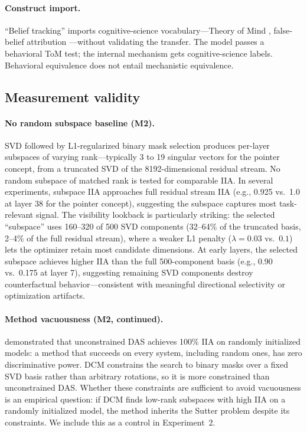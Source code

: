 \documentclass{article}
\begin{document}
\paragraph{Construct import.}
``Belief tracking'' imports cognitive-science vocabulary---Theory of Mind \citep{premack1978chimpanzee}, false-belief attribution \citep{wimmer1983beliefs}---without validating the transfer. The model passes a behavioral ToM test; the internal mechanism gets cognitive-science labels. Behavioral equivalence does not entail mechanistic equivalence.

\subsection{Measurement validity}

\paragraph{No random subspace baseline (M2).}
SVD followed by L1-regularized binary mask selection produces per-layer subspaces of varying rank---typically 3 to 19 singular vectors for the pointer concept, from a truncated SVD of the 8192-dimensional residual stream. No random subspace of matched rank is tested for comparable IIA. In several experiments, subspace IIA approaches full residual stream IIA (e.g., 0.925 vs.\ 1.0 at layer 38 for the pointer concept), suggesting the subspace captures most task-relevant signal. The visibility lookback is particularly striking: the selected ``subspace'' uses 160--320 of 500 SVD components (32--64\% of the truncated basis, 2--4\% of the full residual stream), where a weaker L1 penalty ($\lambda = 0.03$ vs.\ $0.1$) lets the optimizer retain most candidate dimensions. At early layers, the selected subspace achieves higher IIA than the full 500-component basis (e.g., 0.90 vs.\ 0.175 at layer 7), suggesting remaining SVD components destroy counterfactual behavior---consistent with meaningful directional selectivity or optimization artifacts.

\paragraph{Method vacuousness (M2, continued).}
\citet{sutter2025vacuous} demonstrated that unconstrained DAS achieves 100\% IIA on randomly initialized models: a method that succeeds on every system, including random ones, has zero discriminative power. DCM constrains the search to binary masks over a fixed SVD basis rather than arbitrary rotations, so it is more constrained than unconstrained DAS. Whether these constraints are sufficient to avoid vacuousness is an empirical question: if DCM finds low-rank subspaces with high IIA on a randomly initialized model, the method inherits the Sutter problem despite its constraints. We include this as a control in Experiment~2.
\end{document}
